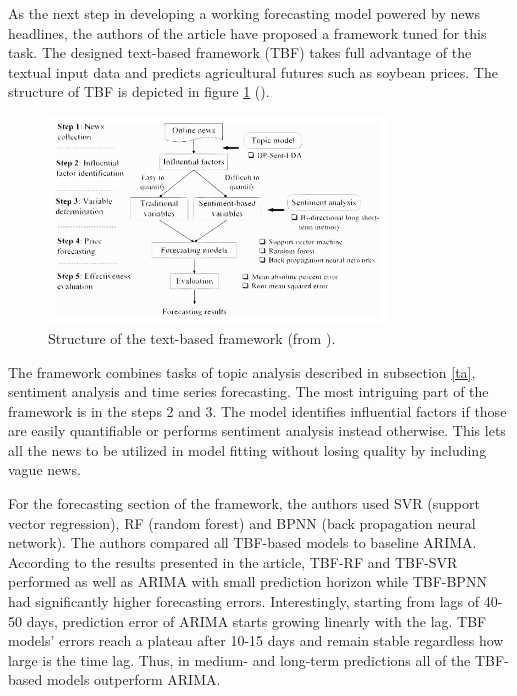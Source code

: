\documentclass[13pt, a4paper]{article}
\begin{document}
As the next step in developing a working forecasting model powered by news headlines, the authors of the article \cite{li2022novel} have proposed a framework tuned for this task. The designed text-based framework (TBF) takes full advantage of the textual input data and predicts agricultural futures such as soybean prices. The structure of TBF is depicted in figure \ref{fig:gr6} (\cite{li2022novel}).
\begin{figure}[h!]\vspace*{4pt}
	\centerline{\includegraphics[width=0.8\textwidth]{./visuals/gr6.pdf}}
	\caption{Structure of the text-based framework (from \cite{li2022novel}).}
\label{fig:gr6}
\end{figure}

The framework combines tasks of topic analysis described in subsection \ref{ta}, sentiment analysis and time series forecasting. The most intriguing part of the framework is in the steps 2 and 3. The model identifies influential factors if those are easily quantifiable or performs sentiment analysis instead otherwise. This lets all the news to be utilized in model fitting without losing quality by including vague news.

For the forecasting section of the framework, the authors used SVR (support vector regression), RF (random forest) and BPNN (back propagation neural network). The authors compared all TBF-based models to baseline ARIMA. According to the results presented in the article, TBF-RF and TBF-SVR performed as well as ARIMA with small prediction horizon while TBF-BPNN had significantly higher forecasting errors. Interestingly, starting from lags of 40-50 days, prediction error of ARIMA starts growing linearly with the lag. TBF models' errors reach a plateau after 10-15 days and remain stable regardless how large is the time lag. Thus, in medium- and long-term predictions all of the TBF-based models outperform ARIMA.
\end{document}
